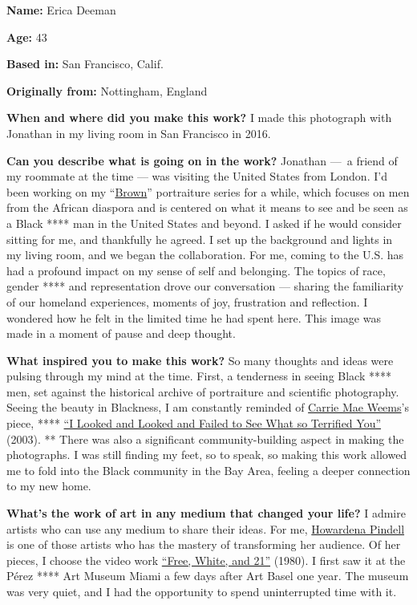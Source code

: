 \textbf{Name:} Erica Deeman

\textbf{Age:} 43

\textbf{Based in:} San Francisco, Calif.

\textbf{Originally from:} Nottingham, England

\textbf{When and where did you make this work?} I made this photograph
with Jonathan in my living room in San Francisco in 2016.

\textbf{Can you describe what is going on in the work?} Jonathan ---~a
friend of my roommate at the time --- was visiting the United States
from London. I'd been working on my
``\href{http://www.ericadeeman.com/new-gallery}{Brown}'' portraiture
series for a while, which focuses on men from the African diaspora and
is centered on what it means to see and be seen as a Black **** man in
the United States and beyond. I asked if he would consider sitting for
me, and thankfully he agreed. I set up the background and lights in my
living room, and we began the collaboration. For me, coming to the U.S.
has had a profound impact on my sense of self and belonging. The topics
of race, gender **** and representation drove our conversation ---
sharing the familiarity of our homeland experiences, moments of joy,
frustration and reflection. I wondered how he felt in the limited time
he had spent here. This image was made in a moment of pause and deep
thought.

\textbf{What inspired you to make this work?} So many thoughts and ideas
were pulsing through my mind at the time. First, a tenderness in seeing
Black **** men, set against the historical archive of portraiture and
scientific photography. Seeing the beauty in Blackness, I am constantly
reminded of
\href{https://www.nytimes3xbfgragh.onion/2020/07/21/t-magazine/carrie-mae-weems-moma-garden.html}{Carrie
Mae Weems}'s piece, ****
\href{https://artmuseum.mtholyoke.edu/object/i-looked-and-looked-and-failed-see-what-so-terrified-you-louisiana-project-series}{``I
Looked and Looked and Failed to See What so Terrified You''} (2003). **
There was also a significant community-building aspect in making the
photographs. I was still finding my feet, so to speak, so making this
work allowed me to fold into the Black community in the Bay Area,
feeling a deeper connection to my new home.

\textbf{What's the work of art in any medium that changed your life?} I
admire artists who can use any medium to share their ideas. For me,
\href{https://www.nytimes3xbfgragh.onion/2020/07/24/t-magazine/howardena-pindell.html}{Howardena
Pindell} is one of those artists who has the mastery of transforming her
audience. Of her pieces, I choose the video work
\href{https://www.youtube.com/watch?v=b5tJNXiB9Ko}{``Free, White, and
21''} (1980). I first saw it at the Pérez **** Art Museum Miami a few
days after Art Basel one year. The museum was very quiet, and I had the
opportunity to spend uninterrupted time with it.

